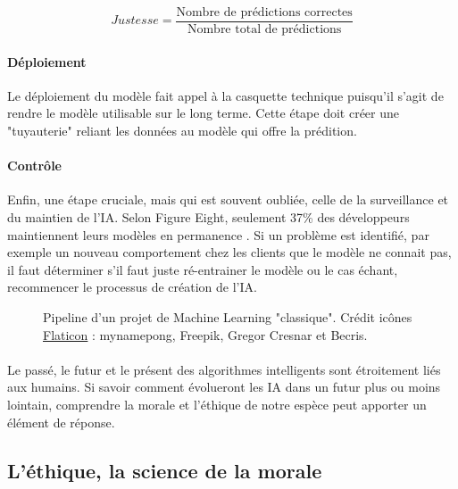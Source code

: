 \documentclass[10pt, french, a4paper]{article}
\begin{document}
\begin{equation}\label{eq:accuracy}
    Justesse = \frac{\text{Nombre de prédictions correctes}}{\text{Nombre total de prédictions}}
\end{equation}

\paragraph{Déploiement}
Le déploiement du modèle fait appel à la casquette technique puisqu'il s'agit de rendre le modèle utilisable sur le long terme. Cette étape doit créer une "tuyauterie" reliant les données au modèle qui offre la prédition. 

\paragraph{Contrôle}
Enfin, une étape cruciale, mais qui est souvent oubliée, celle de la surveillance et du maintien de l'IA. Selon Figure Eight, seulement 37\% des développeurs maintiennent leurs modèles en permanence \citep{figure_eight_state_2019}. Si un problème est identifié, par exemple un nouveau comportement chez les clients que le modèle ne connait pas, il faut déterminer s'il faut juste ré-entrainer le modèle ou le cas échant, recommencer le processus de création de l'IA.  

\begin{center}
\begin{figure}[hbt!]
    \caption{Pipeline d'un projet de Machine Learning "classique". Crédit icônes \href{https://www.flaticon.com/}{Flaticon} : mynamepong, Freepik, Gregor Cresnar et Becris.}
\end{figure}
\end{center}

\paragraph{}
Le passé, le futur et le présent des algorithmes intelligents sont étroitement liés aux humains. Si savoir comment évolueront les IA dans un futur plus ou moins lointain, comprendre la morale et l'éthique de notre espèce peut apporter un élément de réponse.


\subsection{L’éthique, la science de la morale}
\label{subsec:ethique}
\end{document}
